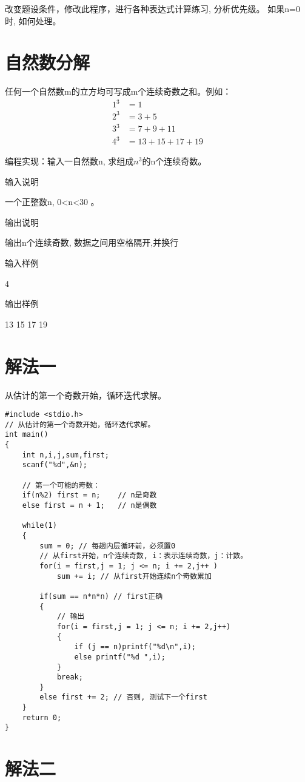 \begin{note}
	改变题设条件，修改此程序，进行各种表达式计算练习, 分析优先级。 如果n=0时, 如何处理。
\end{note}


\section{自然数分解}
任何一个自然数m的立方均可写成m个连续奇数之和。例如：
\begin{align*}
1^3 &=1\\
2^3 &=3+5\\
3^3 &=7+9+11\\
4^3 &=13+15+17+19
\end{align*}

编程实现：输入一自然数n, 求组成$n^3$的n个连续奇数。

输入说明

一个正整数n, 0<n<30 。

输出说明

输出n个连续奇数, 数据之间用空格隔开,并换行

输入样例

4

输出样例

13 15 17 19

\section*{解法一} 

从估计的第一个奇数开始，循环迭代求解。

\begin{lstlisting}
#include <stdio.h>
// 从估计的第一个奇数开始，循环迭代求解。
int main() 
{
	int n,i,j,sum,first;
	scanf("%d",&n);
	
	// 第一个可能的奇数：
	if(n%2) first = n;    // n是奇数 
	else first = n + 1;   // n是偶数 
	
	while(1)
	{
		sum = 0; // 每趟内层循环前，必须置0 
		// 从first开始，n个连续奇数, i：表示连续奇数，j：计数。 
		for(i = first,j = 1; j <= n; i += 2,j++ ) 
			sum += i; // 从first开始连续n个奇数累加 
		
		if(sum == n*n*n) // first正确
		{
			// 输出 
			for(i = first,j = 1; j <= n; i += 2,j++) 
			{
				if (j == n)printf("%d\n",i);
				else printf("%d ",i);
			}
			break;  
		}
		else first += 2; // 否则, 测试下一个first 
	}
	return 0;
} 
\end{lstlisting}

\section*{解法二}

